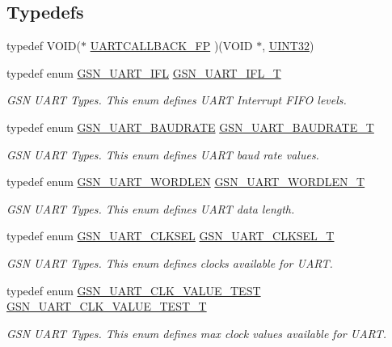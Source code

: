 \subsection*{Typedefs}
\begin{DoxyCompactItemize}
\item 
typedef VOID($\ast$ \hyperlink{a00600_a2e597592e12f52e6b9f19cffdcd2378f}{UARTCALLBACK\_\-FP} )(VOID $\ast$, \hyperlink{a00660_gae1e6edbbc26d6fbc71a90190d0266018}{UINT32})
\item 
typedef enum \hyperlink{a00656_gaca485e5a863be5b5c698317dc0ca469a}{GSN\_\-UART\_\-IFL} \hyperlink{a00656_ga170d0f1af6abfe39aa2dc0586412a85c}{GSN\_\-UART\_\-IFL\_\-T}
\begin{DoxyCompactList}\small\item\em GSN UART Types. This enum defines UART Interrupt FIFO levels. \end{DoxyCompactList}\item 
typedef enum \hyperlink{a00656_ga99b0d3d670ac3d61d3a8764fafc3b992}{GSN\_\-UART\_\-BAUDRATE} \hyperlink{a00656_ga867d009d402b5b0186abe5307715b9fc}{GSN\_\-UART\_\-BAUDRATE\_\-T}
\begin{DoxyCompactList}\small\item\em GSN UART Types. This enum defines UART baud rate values. \end{DoxyCompactList}\item 
typedef enum \hyperlink{a00656_ga9082153fb94765f4ce91b584f1d8a0a3}{GSN\_\-UART\_\-WORDLEN} \hyperlink{a00656_gac850885034c791e458a2edf4a0530f67}{GSN\_\-UART\_\-WORDLEN\_\-T}
\begin{DoxyCompactList}\small\item\em GSN UART Types. This enum defines UART data length. \end{DoxyCompactList}\item 
typedef enum \hyperlink{a00656_gad03ef3aa80077ad749fb3afd6e9a23af}{GSN\_\-UART\_\-CLKSEL} \hyperlink{a00656_ga615bd92bf0cbe48e5b0502e97a57b0a5}{GSN\_\-UART\_\-CLKSEL\_\-T}
\begin{DoxyCompactList}\small\item\em GSN UART Types. This enum defines clocks available for UART. \end{DoxyCompactList}\item 
typedef enum \hyperlink{a00656_ga89a87c4e15500db4330f0d501e2068d1}{GSN\_\-UART\_\-CLK\_\-VALUE\_\-TEST} \hyperlink{a00656_ga52bf28199735274775228339e8d05012}{GSN\_\-UART\_\-CLK\_\-VALUE\_\-TEST\_\-T}
\begin{DoxyCompactList}\small\item\em GSN UART Types. This enum defines max clock values available for UART. \end{DoxyCompactList}\item 

\end{DoxyCompactItemize}
